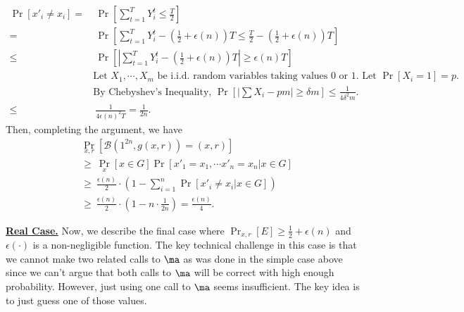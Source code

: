 \begin{align*}
\Pr[x'_i \neq x_i]
=&~ \Pr\left[\sum_{t=1}^T Y_i^t \leq \frac{T}{2} \right]\\
=&~ \Pr\left[\sum_{t=1}^T  Y_i^t- \left(\frac{1}{2} + \epsilon(n) \right)T \leq \frac{T}{2} - \left(\frac{1}{2} + \epsilon(n) \right)T \right]\\
\leq&~ \Pr\left[ \left| \sum_{t=1}^T  Y_i^t- \left(\frac{1}{2} + \epsilon(n) \right)T \right| \geq \epsilon(n)T \right]\\
& \text{Let $X_1,\cdots,X_m$ be i.i.d. random variables taking values 0 or 1. Let $\Pr[X_i=1] = p$.}\\
& \text{By Chebyshev's Inequality, $\Pr\left[ \left| \sum X_i - pm \right| \geq \delta m \right] \leq \frac{1}{4\delta^2 m}$.}\\
\leq&~ \frac{1}{4\epsilon(n)^2T} = \frac{1}{2n}.
\end{align*}
Then, completing the argument, we have
\begin{align*}
&\Pr_{x,r}[\mathcal{B}(1^{2n}, g(x,r)) = (x,r)]\\
&\geq~ \Pr_x [x \in G] \Pr[x'_1 = x_1, \cdots x'_n = x_n | x \in G]\\
&\geq~ \frac{\epsilon(n)}{2} \cdot \left(1- \sum_{i=1}^n\Pr[x'_i \neq x_i | x \in G]\right)\\
&\geq~ \frac{\epsilon(n)}{2} \cdot \left(1- n \cdot\frac{1}{2n} \right) =  \frac{\epsilon(n)}{4}.
\end{align*}



\bigskip
\noindent\textbf{\underline{Real Case.}} Now, we describe the final case where $\Pr_{x,r}[E] \geq \frac{1}{2} + \epsilon(n)$ and $\epsilon(\cdot)$ is a non-negligible function.
The key technical challenge in this case is that we cannot make two related calls to $\ma$ as was done in the simple case above since we can't argue that both calls to $\ma$ will be correct with high enough probability.
However, just using one call to $\ma$ seems insufficient.
The key idea is to just guess one of those values.


